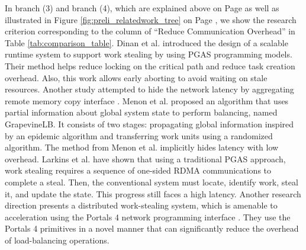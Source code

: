 In branch (3) and branch (4), which are explained above on Page \pageref{exp:branch_1_2_3_4} as well as illustrated in Figure \ref{fig:preli_relatedwork_tree} on Page \pageref{fig:preli_relatedwork_tree}, we show the research criterion corresponding to the column of ``Reduce Communication Overhead'' in Table \ref{tab:comparison_table}. Dinan et al. \cite{dinan2009scalable} introduced the design of a scalable runtime system to support work stealing by using PGAS programming models. Their method helps reduce locking on the critical path and reduce task creation overhead. Also, this work allows early aborting to avoid waiting on stale resources. Another study attempted to hide the network latency by aggregating remote memory copy interface \cite{nieplocha1999armci}. Menon et al. \cite{menon2013distributed} proposed an algorithm that uses partial information about global system state to perform balancing, named GrapevineLB. It consists of two stages: propagating global information inspired by an epidemic algorithm \cite{kermack1932contributions} and transferring work units using a randomized algorithm. The method from Menon et al. \cite{menon2013distributed} implicitly hides latency with low overhead. Larkins et al. \cite{larkins2019accelerated} have shown that using a traditional PGAS approach, work stealing requires a sequence of one-sided RDMA communications to complete a steal. Then, the conventional system must locate, identify work, steal it, and update the state. This progress still faces a high latency. Another research direction presents a distributed work-stealing system, which is amenable to acceleration using the Portals 4 \cite{derradji2015bxi} network programming interface \cite{larkins2019accelerated}. They use the Portals 4 primitives in a novel manner that can significantly reduce the overhead of load-balancing operations.



